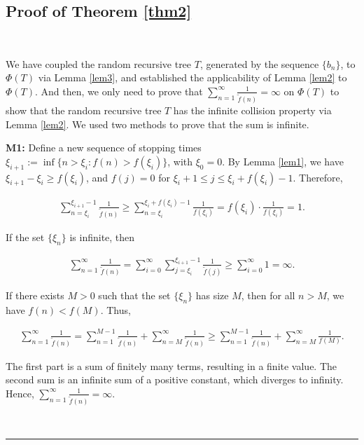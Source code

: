 \documentclass[10pt,twoside]{article}
\renewenvironment{proof}[1]{\noindent\textbf{#1}}{\ \rule{0.5em}{0.5em}}
\begin{document}
\subsection{Proof of Theorem \ref{thm2}}
\begin{proof}\ 

We have coupled the random recursive tree $T$, generated by the sequence $\{b_n\}$, to $\Phi(T)$ via Lemma \ref{lem3}, and established the applicability of Lemma \ref{lem2} to $\Phi(T)$. And then, we only need to prove that $\sum_{n=1}^{\infty} \frac{1}{\tilde{f}(n)} = \infty $ on $\Phi(T)$ to show that the random recursive tree $T$ has the infinite collision property via Lemma \ref{lem2}. We used two methods to prove that the sum is infinite. 
 
\textbf{M1:} Define a new sequence of stopping times $\xi_{i+1} := \inf\{n > \xi_i : f(n) > f(\xi_i)\}$, with $\xi_0 = 0$. By Lemma \ref{lem1}, we have $\xi_{i+1} - \xi_i \geq f(\xi_i)$, and $f(j) = 0$ for $\xi_i + 1 \leq j \leq \xi_i + f(\xi_i) - 1$. Therefore,
 

\begin{eqnarray}
\sum_{n=\xi_i}^{\xi_{i+1}-1} \frac{1}{\tilde{f}(n)} \geq \sum_{n=\xi_i}^{\xi_i + f(\xi_i) - 1} \frac{1}{f(\xi_i)} = f(\xi_i) \cdot \frac{1}{f(\xi_i)} = 1.
\end{eqnarray}

If the set $\{\xi_n\}$ is infinite, then
   

\begin{eqnarray} 
  \sum_{n=1}^{\infty} \frac{1}{\tilde{f}(n)} = \sum_{i=0}^{\infty} \sum_{j=\xi_i}^{\xi_{i+1}-1} \frac{1}{\tilde{f}(j)} \geq \sum_{i=0}^{\infty} 1 = \infty.\label{001}
 \end{eqnarray}

If there exists $M > 0$ such that the set $\{\xi_n\}$ has size $M$, then for all $n > M$, we have $f(n) < f(M)$. Thus,
   

\begin{eqnarray}
  \sum_{n=1}^{\infty} \frac{1}{\tilde{f}(n)} = \sum_{n=1}^{M-1} \frac{1}{\tilde{f}(n)} + \sum_{n=M}^{\infty} \frac{1}{\tilde{f}(n)} \geq \sum_{n=1}^{M-1} \frac{1}{\tilde{f}(n)} + \sum_{n=M}^{\infty} \frac{1}{f(M)}.\label{002}
  \end{eqnarray}

 
The first part is a sum of finitely many terms, resulting in a finite value. The second sum is an infinite sum of a positive constant, which diverges to infinity. Hence, $\sum_{n=1}^{\infty} \frac{1}{\tilde{f}(n)} = \infty$.


\end{proof}
\end{document}

